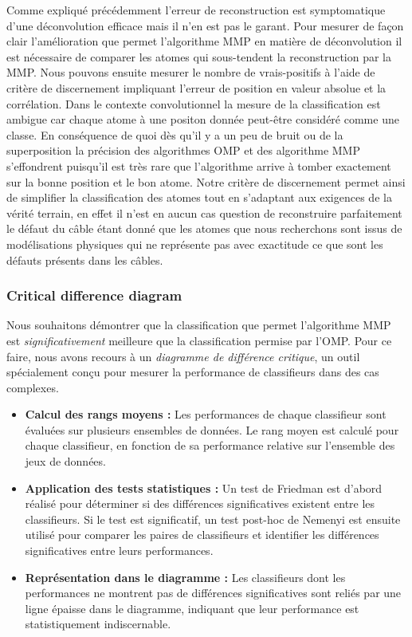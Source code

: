 \documentclass[9pt,a4paper,twoside]{rho}
\begin{document}
Comme expliqué précédemment l'erreur de reconstruction est symptomatique d'une déconvolution efficace mais il n'en est pas le garant.
Pour mesurer de façon clair l'amélioration que permet l'algorithme MMP en matière de déconvolution il est nécessaire de comparer les atomes qui sous-tendent la reconstruction par la MMP.
Nous pouvons ensuite mesurer le nombre de vrais-positifs à l'aide de critère de discernement impliquant l'erreur de position en valeur absolue et la corrélation.
Dans le contexte convolutionnel la mesure de la classification est ambigue car chaque atome à une positon donnée peut-être considéré comme une classe. En conséquence de quoi dès qu'il y a un peu de bruit ou de la superposition la précision des algorithmes OMP et des algorithme MMP s'effondrent puisqu'il est très rare que l'algorithme arrive à tomber exactement sur la bonne position et le bon atome.
Notre critère de discernement permet ainsi de simplifier la classification des atomes tout en s'adaptant aux exigences de la vérité terrain, en effet il n'est en aucun cas question de reconstruire parfaitement le défaut du câble étant donné que les atomes que nous recherchons sont issus de modélisations physiques qui ne représente pas avec exactitude ce que sont les défauts présents dans les câbles.

\newpage

\subsubsection{Critical difference diagram}

Nous souhaitons démontrer que la classification que permet l'algorithme MMP est \textit{significativement} meilleure que la classification permise par l'OMP. Pour ce faire, nous avons recours à un \textit{diagramme de différence critique}, un outil spécialement conçu pour mesurer la performance de classifieurs dans des cas complexes.

\begin{rhoenv}[frametitle=Méthode de construction du diagramme]
    \begin{itemize}
        \item \textbf{Calcul des rangs moyens :} Les performances de chaque classifieur sont évaluées sur plusieurs ensembles de données. Le rang moyen est calculé pour chaque classifieur, en fonction de sa performance relative sur l'ensemble des jeux de données.
        \item \textbf{Application des tests statistiques :} Un test de Friedman est d'abord réalisé pour déterminer si des différences significatives existent entre les classifieurs. Si le test est significatif, un test post-hoc de Nemenyi est ensuite utilisé pour comparer les paires de classifieurs et identifier les différences significatives entre leurs performances.
        \item \textbf{Représentation dans le diagramme :} Les classifieurs dont les performances ne montrent pas de différences significatives sont reliés par une ligne épaisse dans le diagramme, indiquant que leur performance est statistiquement indiscernable.
    \end{itemize}
\end{rhoenv}
\end{document}

